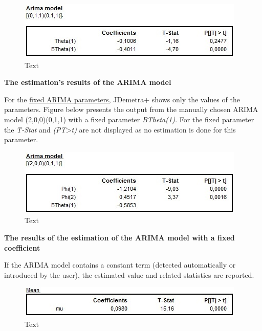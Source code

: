 \documentclass[
  letterpaper,
  DIV=11,
  numbers=noendperiod]{scrreprt}
\begin{document}
\begin{figure}

{\centering \includegraphics{./All_images/image25_RMSB.jpg}

}

\caption{Text}

\end{figure}

\textbf{The estimation's results of the ARIMA model}

For the
\protect\hyperlink{tramo-specification--options-for-manual-identification-of-the-arima-model}{fixed
ARIMA parameters}, JDemetra+ shows only the values of the parameters.
Figure below presents the output from the manually chosen ARIMA model
(2,0,0)(0,1,1) with a fixed parameter \emph{BTheta(1).} For the fixed
parameter the \emph{T-Stat} and
\emph{(P\textbar T\textbar\textgreater t)} are not displayed as no
estimation is done for this parameter.

\begin{figure}

{\centering \includegraphics{./All_images/image26_RMSB.jpg}

}

\caption{Text}

\end{figure}

\textbf{The results of the estimation of the ARIMA model with a fixed
coefficient}

If the ARIMA model contains a constant term (detected automatically or
introduced by the user), the estimated value and related statistics are
reported.

\begin{figure}

{\centering \includegraphics{./All_images/image27_RMSB.jpg}

}

\caption{Text}

\end{figure}
\end{document}
